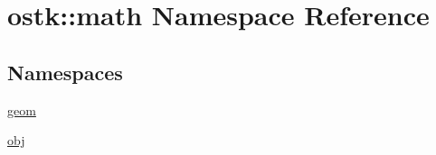 \hypertarget{namespaceostk_1_1math}{}\section{ostk\+:\+:math Namespace Reference}
\label{namespaceostk_1_1math}
\subsection*{Namespaces}
\begin{DoxyCompactItemize}
\item 
 \hyperlink{namespaceostk_1_1math_1_1geom}{geom}
\item 
 \hyperlink{namespaceostk_1_1math_1_1obj}{obj}
\end{DoxyCompactItemize}
